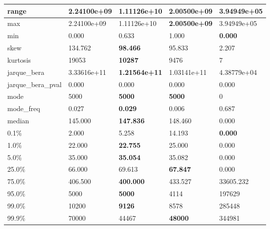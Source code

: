 \begin{table}[H]
\begin{tabular}{|l|m{10em}|m{10em}|m{10em}|m{10em}|}
\hline range & 2.24100e+09 & \cellcolor[rgb]{0.9, 0.54, 0.52} 1.11126e+10 & \bfseries 2.00500e+09 & 3.94949e+05 \\
\hline max & 2.24100e+09 & \cellcolor[rgb]{0.9, 0.54, 0.52} 1.11126e+10 & \bfseries 2.00500e+09 & 3.94949e+05 \\
\hline min & 0.000 & 0.633 & \cellcolor[rgb]{0.9, 0.54, 0.52} 1.000 & \bfseries 0.000 \\
\hline skew & 134.762 & \bfseries 98.466 & 95.833 & \cellcolor[rgb]{0.9, 0.54, 0.52} 2.207 \\
\hline kurtosis & 19053 & \bfseries 10287 & 9476 & \cellcolor[rgb]{0.9, 0.54, 0.52} 7 \\
\hline jarque\_bera & 3.33616e+11 & \bfseries 1.21564e+11 & 1.03141e+11 & \cellcolor[rgb]{0.9, 0.54, 0.52} 4.38779e+04 \\
\hline jarque\_bera\_pval & 0.000 & 0.000 & 0.000 & 0.000 \\
\hline mode & 5000 & \bfseries 5000 & \bfseries 5000 & \cellcolor[rgb]{0.9, 0.54, 0.52} 0 \\
\hline mode\_freq & 0.027 & \bfseries 0.029 & 0.006 & \cellcolor[rgb]{0.9, 0.54, 0.52} 0.687 \\
\hline median & 145.000 & \bfseries 147.836 & 148.460 & \cellcolor[rgb]{0.9, 0.54, 0.52} 0.000 \\
\hline 0.1\% & 2.000 & 5.258 & \cellcolor[rgb]{0.9, 0.54, 0.52} 14.193 & \bfseries 0.000 \\
\hline 1.0\% & 22.000 & \bfseries 22.755 & 25.000 & \cellcolor[rgb]{0.9, 0.54, 0.52} 0.000 \\
\hline 5.0\% & 35.000 & \bfseries 35.054 & 35.082 & \cellcolor[rgb]{0.9, 0.54, 0.52} 0.000 \\
\hline 25.0\% & 66.000 & 69.613 & \bfseries 67.847 & \cellcolor[rgb]{0.9, 0.54, 0.52} 0.000 \\
\hline 75.0\% & 406.500 & \bfseries 400.000 & 433.527 & \cellcolor[rgb]{0.9, 0.54, 0.52} 33605.232 \\
\hline 95.0\% & 5000 & \bfseries 5000 & 4114 & \cellcolor[rgb]{0.9, 0.54, 0.52} 197629 \\
\hline 99.0\% & 10200 & \bfseries 9126 & 8578 & \cellcolor[rgb]{0.9, 0.54, 0.52} 285448 \\
\hline 99.9\% & 70000 & 44467 & \bfseries 48000 & \cellcolor[rgb]{0.9, 0.54, 0.52} 344981 \\
\hline
\end{tabular}
\end{table}
